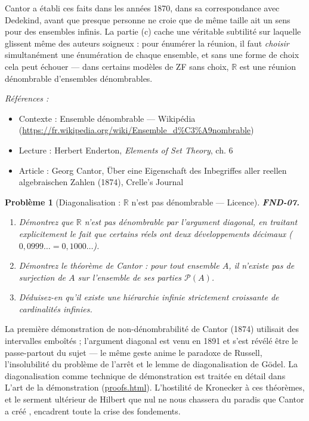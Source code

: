 \documentclass[11pt]{article}
\newtheorem{problem}{Problème}
\newenvironment{refs}{\par\small\noindent\emph{Références :}\begin{itemize}\setlength\itemsep{0pt}}{\end{itemize}\normalsize}
\begin{document}
\noindent Cantor a établi ces faits dans les années 1870, dans sa correspondance avec
Dedekind, avant que presque personne ne croie que \og{} de même taille \fg{} ait un sens pour des
ensembles infinis. La partie (c) cache une véritable subtilité sur laquelle glissent même des
auteurs soigneux : pour énumérer la réunion, il faut \textit{choisir} simultanément une énumération
de chaque ensemble, et sans une forme de choix cela peut échouer --- dans certains modèles de ZF
sans choix, $\mathbb{R}$ est une réunion dénombrable d'ensembles dénombrables.

\begin{refs}
\item Contexte : Ensemble dénombrable --- Wikipédia (\url{https://fr.wikipedia.org/wiki/Ensemble_d%C3%A9nombrable})
\item Lecture : Herbert Enderton, \textit{Elements of Set Theory}, ch. 6
\item Article : Georg Cantor, \og{} Über eine Eigenschaft des Inbegriffes aller reellen algebraischen Zahlen \fg{} (1874), Crelle's Journal
\end{refs}

\bigskip

\begin{problem}[{Diagonalisation : $\mathbb{R}$ n'est pas dénombrable --- Licence}]
\textbf{FND-07.} \begin{enumerate}
\item[(a)] Démontrez que $ \mathbb{R} $ n'est pas dénombrable par l'argument
diagonal, en traitant explicitement le fait que certains réels ont deux développements décimaux
($ 0{,}0999\ldots = 0{,}1000\ldots $).
\item[(b)] Démontrez le théorème de Cantor : pour tout ensemble
$ A $, il n'existe pas de surjection de $ A $ sur l'ensemble de ses parties
$ \mathcal{P}(A) $.
\item[(c)] Déduisez-en qu'il existe une hiérarchie infinie strictement croissante de cardinalités
infinies.
\end{enumerate}

\end{problem}

\noindent La première démonstration de non-dénombrabilité de Cantor (1874) utilisait des
intervalles emboîtés ; l'argument diagonal est venu en 1891 et s'est révélé être le passe-partout
du sujet --- le même geste anime le paradoxe de Russell, l'insolubilité du problème de l'arrêt et
le lemme de diagonalisation de Gödel. La diagonalisation comme technique de démonstration est
traitée en détail dans L'art de la démonstration (\url{proofs.html}). L'hostilité de
Kronecker à ces théorèmes, et le serment ultérieur de Hilbert que \og{} nul ne nous chassera du
paradis que Cantor a créé \fg{}, encadrent toute la crise des fondements.
\end{document}
